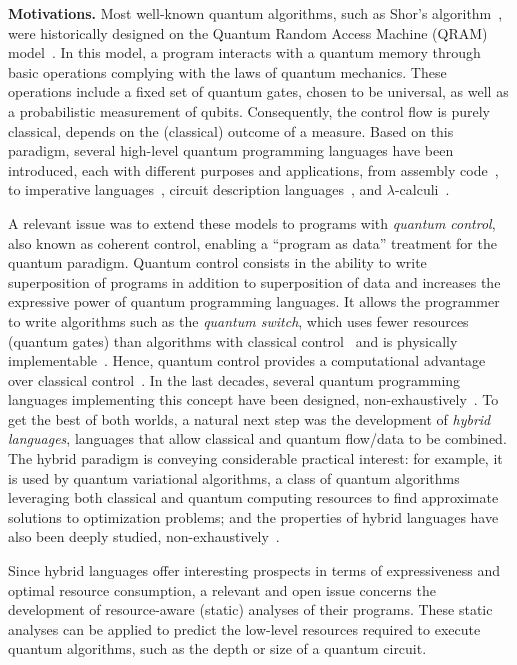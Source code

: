 \textbf{Motivations. }
Most well-known quantum algorithms, such as Shor's algorithm~\cite{Sho97}, were
historically designed on the Quantum Random Access Machine (QRAM)
model~\cite{Kni22}. In this model, a program
interacts with a quantum memory through basic operations complying with the
laws of quantum mechanics. These operations include a fixed set of quantum
gates, chosen to be universal, as well as a probabilistic measurement of
qubits. Consequently, the control flow is purely classical, \ie depends on the
(classical) outcome of a measure. Based on  this paradigm, several high-level
quantum programming languages have been introduced, each with different
purposes and applications, from assembly code~\cite{QASM17,QASM22}, to
imperative languages~\cite{FY21}, circuit description languages~\cite{GLRSV13},
and $\lambda$-calculi~\cite{SV09}.

A relevant issue was to extend these models to programs with \emph{quantum
control}, also known as coherent control, enabling a ``program as data''
treatment for the quantum paradigm. Quantum control consists in the ability to
write superposition of programs in addition to superposition of data and
increases the expressive power of quantum programming languages. It allows the
programmer to write algorithms such as the \emph{quantum switch}, which uses
fewer resources (quantum gates) than algorithms with classical
control~\cite{CAPV13} and is physically implementable~\cite{AWHM20,PMA+15}.
Hence, quantum control provides a computational advantage over classical
control~\cite{ACB14,TCM+21,KOY24}. In the last decades, several  quantum
programming languages implementing this concept have been designed,
non-exhaustively~\cite{AG05,SVV18,DCM22,Lem24, YVC24}. To get the best of both worlds,
a natural next step was the development of \emph{hybrid languages}, \ie
languages that allow classical and quantum flow/data to be combined.
The hybrid paradigm is conveying considerable practical interest: for example,
it is used by quantum variational algorithms, a class of quantum algorithms
leveraging both classical and quantum computing resources to find approximate
solutions to optimization problems; and the properties of hybrid languages have
also been deeply studied, non-exhaustively~\cite{Qunity23,Yin24,DLPZ25,BPP25}.

Since hybrid languages offer interesting prospects in terms of expressiveness
and optimal resource consumption, a relevant and open issue concerns the
development of resource-aware (static) analyses of their programs. These static
analyses can be applied to predict the low-level resources required to execute
quantum algorithms, such as the depth or size of a quantum circuit.

